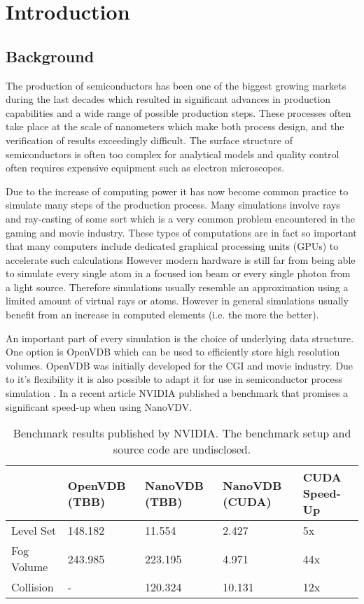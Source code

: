 \section{Introduction}
\subsection{Background}
The production of semiconductors has been one of the biggest growing markets during the last decades which resulted in significant advances in production capabilities and a wide range of possible production steps.
These processes often take place at the scale of nanometers which make both process design, and the verification of results exceedingly difficult.
The surface structure of semiconductors is often too complex for analytical models and quality control often requires expensive equipment such as electron microscopes.

Due to the increase of computing power it has now become common practice to simulate many steps of the production process.
Many simulations involve rays and ray-casting of some sort which is a very common problem encountered in the gaming and movie industry.
These types of computations are in fact so important that many computers include dedicated graphical processing units (GPUs) to accelerate such calculations
However modern hardware is still far from being able to simulate every single atom in a focused ion beam or every single photon from a light source.
Therefore simulations usually resemble an approximation using a limited amount of virtual rays or atoms.
However in general simulations usually benefit from an increase in computed elements (i.e. the more the better).

An important part of every simulation is the choice of underlying data structure.
One option is OpenVDB which can be used to efficiently store high resolution volumes. \cite{openvdb}
OpenVDB was initially developed for the CGI and movie industry. Due to it's flexibility it is also possible to adapt it for use in semiconductor process simulation \cite{manstetten2018efficient}.
In a recent article  NVIDIA published a benchmark that promises a significant speed-up when using NanoVDV.

\begin{table}[H]
	\caption{Benchmark results published by NVIDIA. The benchmark setup and source code are undisclosed. \cite{nanovdb_nvidia}}
	\centering
	\begin{tabular}{@{}lllll@{}}
		\toprule
		           & OpenVDB (TBB) & NanoVDB (TBB) & NanoVDB (CUDA) & CUDA Speed-Up \\	\hline
		Level Set  & 148.182       & 11.554        & 2.427          & 5x            \\
		Fog Volume & 243.985       & 223.195       & 4.971          & 44x           \\
		Collision  & -             & 120.324       & 10.131         & 12x           \\ \bottomrule
	\end{tabular}
	\label{tab:nvidia_benchmark}
\end{table}


